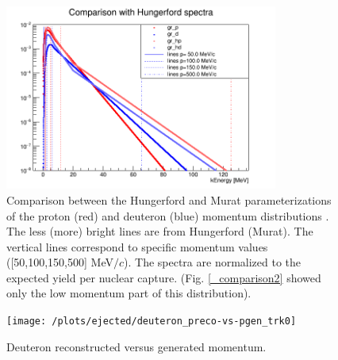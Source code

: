 \documentclass[12pt,a4paper,openright, oneside, titlepage]{book} %
\begin{document}
\begin{figure}[h!]
\centering
\includegraphics[width =0.8\textwidth, keepaspectratio]{new_spectra_2/comparison}
\caption[Comparison of two parameterizaion on the full momentum range]
{Comparison between the Hungerford and Murat parameterizations of the proton (red)  and deuteron (blue)
momentum distributions \cite{Hungerford} \cite{Pasha:spectra}. 
The less (more) bright lines are from Hungerford (Murat). 
The vertical lines correspond to specific momentum values ([50,100,150,500] MeV$/c$). The spectra are normalized to the expected yield per nuclear capture.
(Fig. \ref{_comparison2} showed only the low momentum part of this distribution). }
\label{_comparison}
\end{figure}

\begin{figure}[!htb]
\centering
\texttt{[image: /plots/ejected/deuteron\_preco-vs-pgen\_trk0]}
\caption[Deuteron reconstructed vs generated momentum]
{Deuteron reconstructed versus generated momentum.}
\label{_deuteron_preco-vs-pgen_trk0}
\end{figure}
\end{document}
